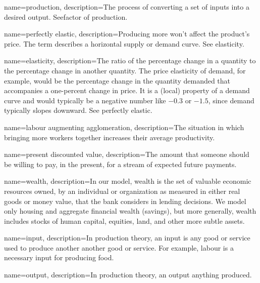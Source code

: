{
name=production,
description={The process of converting a set of \glspl{input} into a desired \gls{output}. See\gls{factor of production}.}
}

{
name=perfectly elastic,
description={Producing more won't affect the product's price. The term describes a  horizontal supply or demand curve. See \gls{elasticity}.} %
}

{
name=elasticity,
description={The ratio of the percentage change in a quantity to the percentage change in another quantity. The price elasticity of demand, for  example, would be the percentage change in the quantity demanded that accompanies a one-percent change in price. It is a (local) property of a demand curve and would typically be a negative number like $-0.3$ or $-1.5$, since demand typically slopes downward. See \gls{perfectly elastic}.}
}

{
name=labour augmenting agglomeration,
description={The situation in which bringing more workers together increases their average productivity.}
}

{
name=present discounted value,
description={The amount that someone should be willing to pay, in the present, for a stream of expected future payments.}
}

{
name=wealth,
description={In our model, wealth is the set of valuable economic resources owned, by an individual or organization as measured in either real goods or money value, that the bank considers in lending decisions. We model only housing and aggregate financial wealth (savings), but more generally, wealth includes stocks of human capital, equities, land, and other more subtle assets.}
}

{
name=input,
description={In production theory, an input is any good or service used to produce another another good or service. %
For example, labour is a necessary input for producing food. }
}

{
name=output,
description={In production theory, an output anything produced.} %
}

